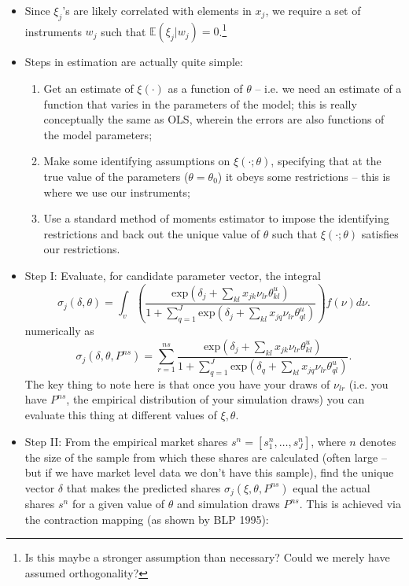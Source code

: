 \documentclass[11pt]{article}
\numberwithin{equation}{section}
\begin{document}
\begin{itemize}
		\item Since $\xi_{j}$'s are likely correlated with elements in $x_{j}$, we require a set of instruments $w_{j}$ such that $\mathbb{E}(\xi_j | w_j)=0$.\footnote{Is this maybe a stronger assumption than necessary? Could we merely have assumed orthogonality?}
		\item Steps in estimation are actually quite simple:
		\begin{enumerate}
			\item Get an estimate of $\xi(\cdot)$ as a function of $\theta$ -- i.e. we need an estimate of a function that varies in the parameters of the model; this is really conceptually the same as OLS, wherein the errors are also functions of the model parameters;
			\item Make some identifying assumptions on $\xi(\cdot;\theta)$, specifying that at the true value of the parameters ($\theta=\theta_0$) it obeys some restrictions -- this is where we use our instruments;
			\item Use a standard method of moments estimator to impose the identifying restrictions and back out the unique value of $\theta$ such that $\xi(\cdot;\theta)$ satisfies our restrictions.
		\end{enumerate}
		\item Step I: Evaluate, for candidate parameter vector, the integral
		\begin{equation}
		\sigma_j(\delta,\theta) = \int_{v}\left(\frac{\text{exp}(\delta_j + \sum_{kl}x_{jk}\nu_{lr}\theta_{kl}^u)}{1 + \sum_{q=1}^{J}\text{exp}(\delta_j + \sum_{kl}x_{jq}\nu_{lr}\theta_{ql}^u)}\right) f(\nu)d\nu.
		\end{equation}
		numerically as
		\begin{equation}
		\sigma_j(\delta,\theta,P^{ns}) = \sum_{r=1}^{ns}\frac{\text{exp}(\delta_j + \sum_{kl}x_{jk}\nu_{lr}\theta_{kl}^u)}{1 + \sum_{q=1}^{J}\text{exp}(\delta_q + \sum_{kl}x_{jq}\nu_{lr}\theta_{ql}^u)}.
		\end{equation}
		The key thing to note here is that once you have your draws of $\nu_{lr}$ (i.e. you have $P^{ns}$, the empirical distribution of your simulation draws) you can evaluate this thing at different values of $\xi,\theta$.
		\item Step II: From the empirical market shares $s^n = [s^n_1,\dots, s^n_J]$, where $n$ denotes the size of the sample from which these shares are calculated (often large -- but if we have market level data we don't have this sample), find the unique vector $\delta$ that makes the predicted shares $\sigma_j(\xi,\theta,P^{ns})$ equal the actual shares $s^n$ for a given value of $\theta$ and simulation draws $P^{ns}$. This is achieved via the contraction mapping (as shown by BLP 1995):

\end{itemize}
\end{document}
